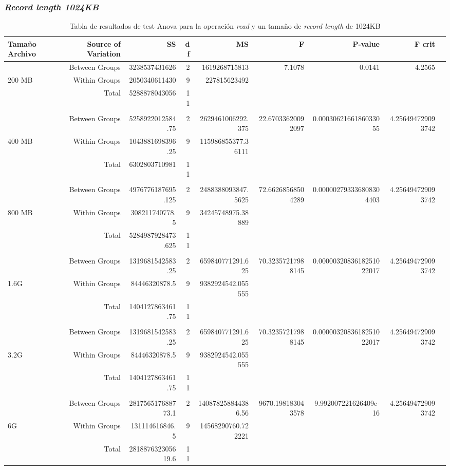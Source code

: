 \begin{landscape}
\subsubsection{\textit{Record length 1024KB}}
\begin{table}[!htp]\centering
\caption{Tabla de resultados de test Anova para la operación \textit{read} y un tamaño de \textit{record length} de 1024KB}\label{tab: }
\scriptsize
\begin{tabular}{lrrrrrrrr}\toprule
Tamaño Archivo &Source of Variation &SS &df &MS &F &P-value &F crit \\\midrule
&Between Groups &3238537431626 &2 &1619268715813 &7.1078 &0.0141 &4.2565 \\
200 MB &Within Groups &2050340611430 &9 &227815623492 & & & \\
&Total &5288878043056 &11 & & & & \\
& & & & & & & \\
&Between Groups &5258922012584.75 &2 &2629461006292.375 &22.67033620092097 &0.0003062166186033055 &4.256494729093742 \\
400 MB &Within Groups &1043881698396.25 &9 &115986855377.36111 & & & \\
&Total &6302803710981 &11 & & & & \\
& & & & & & & \\
&Between Groups &4976776187695.125 &2 &2488388093847.5625 &72.66268568504289 &0.000002793336808304403 &4.256494729093742 \\
800 MB &Within Groups &308211740778.5 &9 &34245748975.38889 & & & \\
&Total &5284987928473.625 &11 & & & & \\
& & & & & & & \\
&Between Groups &1319681542583.25 &2 &659840771291.625 &70.32357217988145 &0.0000032083618251022017 &4.256494729093742 \\
1.6G &Within Groups &84446320878.5 &9 &9382924542.055555 & & & \\
&Total &1404127863461.75 &11 & & & & \\
& & & & & & & \\
&Between Groups &1319681542583.25 &2 &659840771291.625 &70.32357217988145 &0.0000032083618251022017 &4.256494729093742 \\
3.2G &Within Groups &84446320878.5 &9 &9382924542.055555 & & & \\
&Total &1404127863461.75 &11 & & & & \\
& & & & & & & \\
&Between Groups &281756517688773.1 &2 &140878258844386.56 &9670.198183043578 &9.992007221626409e-16 &4.256494729093742 \\
6G &Within Groups &131114616846.5 &9 &14568290760.722221 & & & \\
&Total &281887632305619.6 &11 & & & & \\
\bottomrule
\end{tabular}
\end{table}

\end{landscape}

